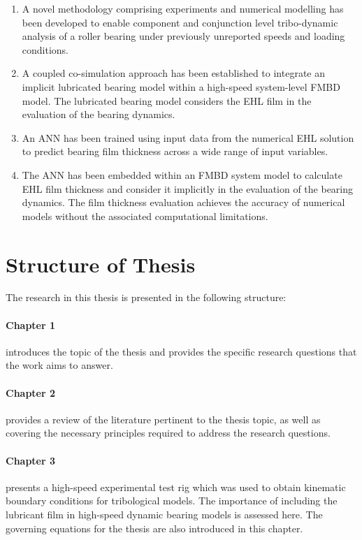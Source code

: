 \begin{enumerate}
	\item A novel methodology comprising experiments and numerical modelling has been developed to enable component and conjunction level tribo-dynamic analysis of a roller bearing under previously unreported speeds and loading conditions.
	\item A coupled co-simulation approach has been established to integrate an implicit lubricated bearing model within a high-speed system-level FMBD model. The lubricated bearing model considers the EHL film in the evaluation of the bearing dynamics.
	\item An ANN has been trained using input data from the numerical EHL solution to predict bearing film thickness across a wide range of input variables.
	\item The ANN has been embedded within an FMBD system model to calculate EHL film thickness and consider it implicitly in the evaluation of the bearing dynamics. The film thickness evaluation achieves the accuracy of numerical models without the associated computational limitations.
\end{enumerate}

\section{Structure of Thesis} \label{Structure of Thesis}

The research in this thesis is presented in the following structure:

\paragraph{Chapter 1} introduces the topic of the thesis and provides the specific research questions that the work aims to answer.

\paragraph{Chapter 2} provides a review of the literature pertinent to the thesis topic, as well as covering the necessary principles required to address the research questions.

\paragraph{Chapter 3} presents a high-speed experimental test rig which was used to obtain kinematic boundary conditions for tribological models. The importance of including the lubricant film in high-speed dynamic bearing models is assessed here. The governing equations for the thesis are also introduced in this chapter.

